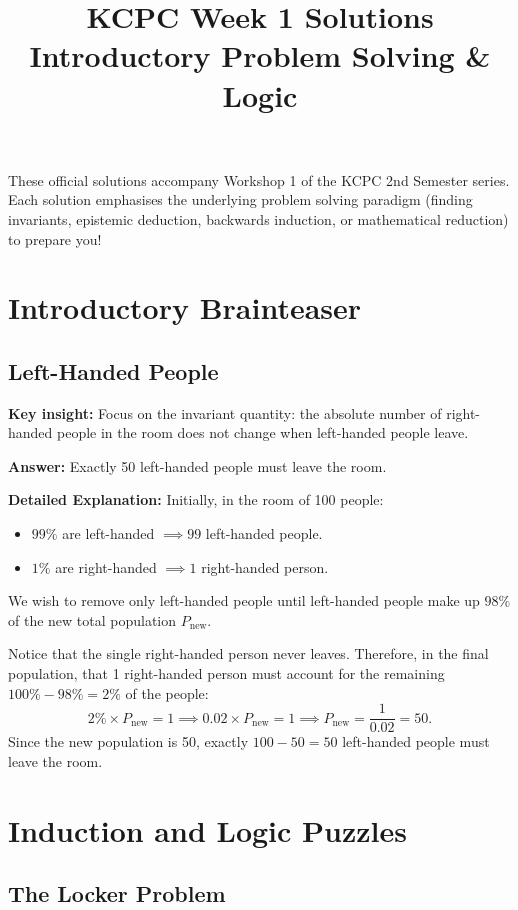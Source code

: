 \documentclass[12pt]{article}
\title{KCPC Week 1 Solutions\\Introductory Problem Solving \& Logic}
\author{}
\date{}
\newcommand{\insight}[1]{\par\medskip\noindent\textbf{Key insight:} #1}
\begin{document}
\maketitle
\thispagestyle{fancy}

\noindent
These official solutions accompany Workshop 1 of the KCPC 2nd Semester series. Each solution emphasises the underlying problem solving paradigm (finding invariants, epistemic deduction, backwards induction, or mathematical reduction) to prepare you!

\section{Introductory Brainteaser}

\subsection{Left-Handed People}

\insight{Focus on the invariant quantity: the absolute number of right-handed people in the room does not change when left-handed people leave.}

\textbf{Answer:} Exactly 50 left-handed people must leave the room.

\textbf{Detailed Explanation:}
Initially, in the room of 100 people:
\begin{itemize}
    \item $99\%$ are left-handed $\implies 99$ left-handed people.
    \item $1\%$ are right-handed $\implies 1$ right-handed person.
\end{itemize}
We wish to remove only left-handed people until left-handed people make up $98\%$ of the new total population $P_{\text{new}}$.

Notice that the single right-handed person never leaves. Therefore, in the final population, that 1 right-handed person must account for the remaining $100\% - 98\% = 2\%$ of the people:
\[
2\% \times P_{\text{new}} = 1 \implies 0.02 \times P_{\text{new}} = 1 \implies P_{\text{new}} = \frac{1}{0.02} = 50.
\]
Since the new population is 50, exactly $100 - 50 = 50$ left-handed people must leave the room.

\section{Induction and Logic Puzzles}

\subsection{The Locker Problem}
\end{document}
